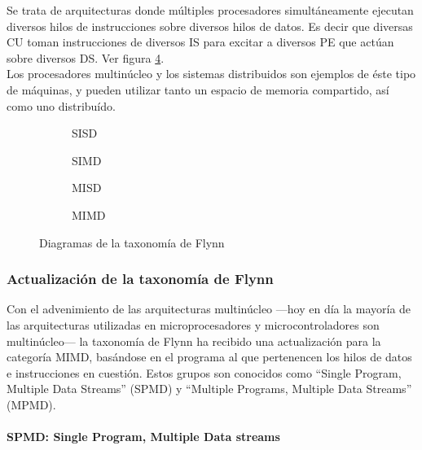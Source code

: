 Se trata de arquitecturas donde múltiples procesadores simultáneamente ejecutan 
diversos hilos de instrucciones sobre diversos hilos de datos. Es decir que 
diversas CU toman instrucciones de diversos IS para excitar a diversos PE que 
actúan sobre diversos DS. Ver figura \ref{subfig:mimd}.\\
Los procesadores multinúcleo y los sistemas distribuidos son ejemplos de éste 
tipo de máquinas, y pueden utilizar tanto un espacio de memoria compartido, así 
como uno distribuído.
\begin{figure}
  \begin{subfigure}[b]{0.5\textwidth}
    
    \caption{SISD}
    \label{subfig:sisd}
  \end{subfigure}
  \begin{subfigure}[b]{0.5\textwidth}
    
    \caption{SIMD}
    \label{subfig:simd}
  \end{subfigure}
  \begin{subfigure}[b]{0.5\textwidth}
    
    \caption{MISD}
    \label{subfig:misd}
  \end{subfigure}
  \begin{subfigure}[b]{0.5\textwidth}
    
    \caption{MIMD}
    \label{subfig:mimd}
  \end{subfigure}
  \caption{Diagramas de la taxonomía de Flynn}
  \label{fig:flynn_taxonomy}
\end{figure}

\subsubsection{Actualización de la taxonomía de Flynn}
\label{subsubsec:theory-modern-flynn_taxonomy-today}

Con el advenimiento de las arquitecturas multinúcleo ---hoy en día la mayoría 
de las arquitecturas utilizadas en microprocesadores y microcontroladores son 
multinúcleo--- la taxonomía de Flynn ha recibido una actualización para la 
categoría MIMD, basándose en el programa al que pertenencen los hilos de datos 
e instrucciones en cuestión. Estos grupos son conocidos como ``Single Program, 
Multiple Data Streams'' (SPMD) y ``Multiple Programs, Multiple Data Streams'' 
(MPMD).

\paragraph{SPMD: Single Program, Multiple Data streams}
\label{par:theory-modern-flynn_taxonomy-today-SPMD}

